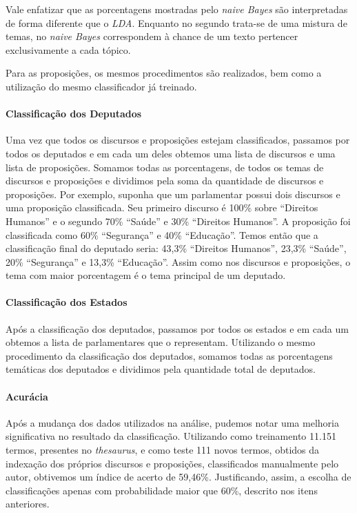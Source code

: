 Vale enfatizar que as porcentagens mostradas pelo \textit{naive Bayes} são interpretadas de forma diferente que o \textit{LDA}. Enquanto no segundo trata-se de uma mistura de temas, no \textit{naive Bayes} correspondem à chance de um texto pertencer exclusivamente a cada tópico.

Para as proposições, os mesmos procedimentos são realizados, bem como a utilização do mesmo classificador já treinado.

\paragraph{Classificação dos Deputados}

Uma vez que todos os discursos e proposições estejam classificados, passamos por todos os deputados e em cada um deles obtemos uma lista de discursos e uma lista de proposições. Somamos todas as porcentagens, de todos os temas de discursos e proposições e dividimos pela soma da quantidade de discursos e proposições. Por exemplo, suponha que um parlamentar possui dois discursos e uma proposição classificada. Seu primeiro discurso é 100\% sobre ``Direitos Humanos'' e o segundo 70\% ``Saúde'' e 30\% ``Direitos Humanos''. A proposição foi classificada como 60\% ``Segurança'' e 40\% ``Educação''. Temos então que a classificação final do deputado seria: 43,3\% ``Direitos Humanos'', 23,3\% ``Saúde'', 20\% ``Segurança'' e 13,3\% ``Educação''. Assim como nos discursos e proposições, o tema com maior porcentagem é o tema principal de um deputado.

\paragraph{Classificação dos Estados}

Após a classificação dos deputados, passamos por todos os estados e em cada um obtemos a lista de parlamentares que o representam. Utilizando o mesmo procedimento da classificação dos deputados, somamos todas as porcentagens temáticas dos deputados e dividimos pela quantidade total de deputados.

\paragraph{Acurácia}

Após a mudança dos dados utilizados na análise, pudemos notar uma melhoria significativa no resultado da classificação. Utilizando como treinamento 11.151 termos, presentes no \textit{thesaurus}, e como teste 111 novos termos, obtidos da indexação dos próprios discursos e proposições, classificados manualmente pelo autor, obtivemos um índice de acerto de 59,46\%. Justificando, assim, a escolha de classificações apenas com probabilidade maior que 60\%, descrito nos itens anteriores.
